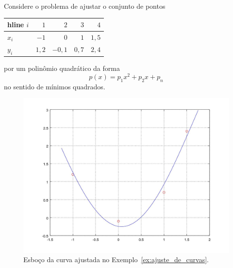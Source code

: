 \begin{ex}\label{ex:ajuste_de_polinomios}
  Considere o problema de ajustar o conjunto de pontos
  \begin{center}
    \begin{tabular}{|l|rrrr|}\\hline
      $i$ & $1$ & $2$ & $3$ & $4$ \\\hline
      $x_i$ & $-1$ & $0$ & $1$ & $1,5$\\
      $y_i$ & $1,2$ & $-0,1$ & $0,7$ & $2,4$\\\hline
    \end{tabular}
  \end{center}
  por um polinômio quadrático da forma
  \begin{equation}
    p(x) = p_1x^2 + p_2x + p_n
  \end{equation}
  no sentido de mínimos quadrados.

\begin{figure}[h]
  \centering
  \includegraphics[width=\textwidth]{cap_ajuste/figs/ex_mq_curvas/ex_mq_curvas}
  \caption{Esboço da curva ajustada no Exemplo~\ref{ex:ajuste_de_curvas}.}
  \label{fig:ex_mq_poli}
\end{figure}



\end{ex}
